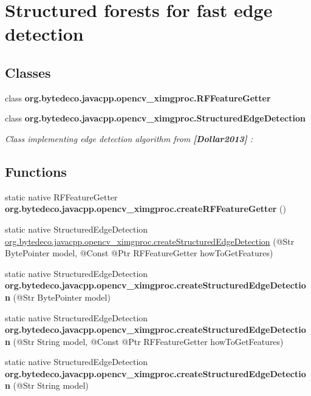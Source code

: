 \hypertarget{group__ximgproc__edge}{}\section{Structured forests for fast edge detection}
\label{group__ximgproc__edge}
\subsection*{Classes}
\begin{DoxyCompactItemize}
\item 
class {\bfseries org.\+bytedeco.\+javacpp.\+opencv\+\_\+ximgproc.\+R\+F\+Feature\+Getter}
\item 
class {\bfseries org.\+bytedeco.\+javacpp.\+opencv\+\_\+ximgproc.\+Structured\+Edge\+Detection}
\begin{DoxyCompactList}\small\item\em Class implementing edge detection algorithm from {\bfseries [Dollar2013]} \+: \end{DoxyCompactList}\end{DoxyCompactItemize}
\subsection*{Functions}
\begin{DoxyCompactItemize}
\item 
\mbox{\label{group__ximgproc__edge_gab13b294f2007e612136d9145b9b6e17f}} 
static native R\+F\+Feature\+Getter {\bfseries org.\+bytedeco.\+javacpp.\+opencv\+\_\+ximgproc.\+create\+R\+F\+Feature\+Getter} ()
\item 
static native Structured\+Edge\+Detection \hyperlink{group__ximgproc__edge_gafcb7c834ebdb82e5b362789a94b9e034}{org.\+bytedeco.\+javacpp.\+opencv\+\_\+ximgproc.\+create\+Structured\+Edge\+Detection} (@Str Byte\+Pointer model, @Const @Ptr R\+F\+Feature\+Getter how\+To\+Get\+Features)
\item 
\mbox{\label{group__ximgproc__edge_ga6b4f3884b1b089f3354f7e2aee639280}} 
static native Structured\+Edge\+Detection {\bfseries org.\+bytedeco.\+javacpp.\+opencv\+\_\+ximgproc.\+create\+Structured\+Edge\+Detection} (@Str Byte\+Pointer model)
\item 
\mbox{\label{group__ximgproc__edge_ga281a53b59598a99db10a7c2838c4448c}} 
static native Structured\+Edge\+Detection {\bfseries org.\+bytedeco.\+javacpp.\+opencv\+\_\+ximgproc.\+create\+Structured\+Edge\+Detection} (@Str String model, @Const @Ptr R\+F\+Feature\+Getter how\+To\+Get\+Features)
\item 
\mbox{\label{group__ximgproc__edge_ga76320db1e540ade1930be1bcd71c2fc1}} 
static native Structured\+Edge\+Detection {\bfseries org.\+bytedeco.\+javacpp.\+opencv\+\_\+ximgproc.\+create\+Structured\+Edge\+Detection} (@Str String model)
\end{DoxyCompactItemize}



